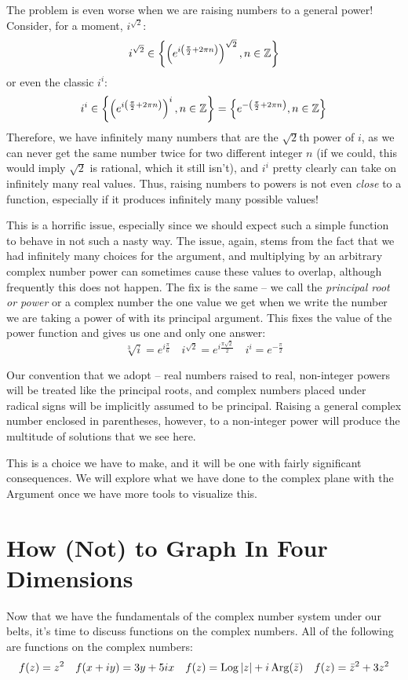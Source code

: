 \documentclass[12pt]{scrartcl}
\begin{document}
The problem is even worse when we are raising numbers to a general power! Consider, for a moment, $i^{\sqrt{2}}$:
\[
	i^{\sqrt{2}} \in \left\{ \left(e^{i \left(\frac{\pi}{2} + 2\pi n \right) } \right)^{\sqrt{2}}, n \in \mathbb Z \right\}
\]
or even the classic $i^i$:
\[
	i^i \in \left\{ \left(e^{i \left(\frac{\pi}{2} + 2\pi n \right) } \right)^i, n \in \mathbb Z \right\} = \left\{ e^{- \left(\frac{\pi}{2} + 2\pi n \right) } , n \in \mathbb Z \right\}
\]
Therefore, we have infinitely many numbers that are the $\sqrt{2}$th power of $i$, as we can never get the same number twice for two different integer $n$ (if we could, this would imply $\sqrt{2}$ is rational, which it still isn't), and $i^i$ pretty clearly can take on infinitely many real values. Thus, raising numbers to powers is not even \textit{close} to a function, especially if it produces infinitely many possible values!

This is a horrific issue, especially since we should expect such a simple function to behave in not such a nasty way. The issue, again, stems from the fact that we had infinitely many choices for the argument, and multiplying by an arbitrary complex number power can sometimes cause these values to overlap, although frequently this does not happen. The fix is the same -- we call the \textit{principal root or power} or a complex number the one value we get when we write the number we are taking a power of with its principal argument. This fixes the value of the power function and gives us one and only one answer:
\[
	\sqrt[3]{i} = e^{i \frac{\pi}{6}} \quad i^{\sqrt{2}} = e^{i \frac{\pi \sqrt{2}}{2}} \quad i^i = e^{-\frac{\pi}{2}}
\]

Our convention that we adopt -- real numbers raised to real, non-integer powers will be treated like the principal roots, and complex numbers placed under radical signs will be implicitly assumed to be principal. Raising a general complex number enclosed in parentheses, however, to a non-integer power will produce the multitude of solutions that we see here.

This is a choice we have to make, and it will be one with fairly significant consequences. We will explore what we have done to the complex plane with the Argument once we have more tools to visualize this.


\section{How (Not) to Graph In Four Dimensions}
Now that we have the fundamentals of the complex number system under our belts, it's time to discuss functions on the complex numbers. All of the following are functions on the complex numbers:
\[
	f(z) = z^2 \quad f(x+iy) = 3y + 5ix \quad f(z) = \operatorname*{Log} |z| + i \operatorname*{Arg}(\bar{z}) \quad f(z) = \bar{z}^2 + 3z^2
\]
\end{document}
